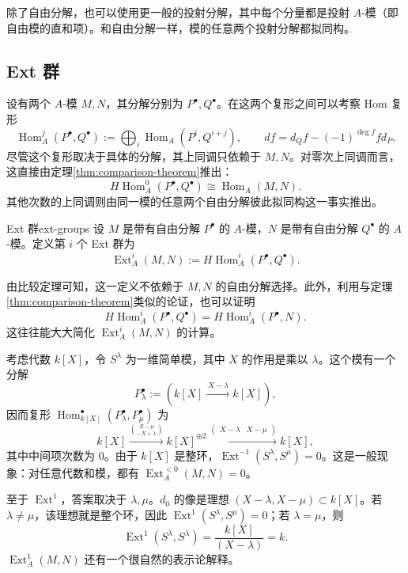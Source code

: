 \begin{note}
除了自由分解，也可以使用更一般的投射分解，其中每个分量都是投射 $A$-模（即自由模的直和项）。和自由分解一样，模的任意两个投射分解都拟同构。
\end{note}

\subsection{Ext 群}\label{subsec:ext-groups}
设有两个 $A$-模 $M,N$，其分解分别为 $P^\bullet,Q^\bullet$。在这两个复形之间可以考察 Hom 复形
\[
  \operatorname{Hom}_A^j(P^\bullet,Q^\bullet)
  :=\bigoplus_i\operatorname{Hom}_A(P^i,Q^{i+j}),
  \qquad
  df=d_Qf-(-1)^{\deg f}fd_P.
\]
尽管这个复形取决于具体的分解，其上同调只依赖于 $M,N$。对零次上同调而言，这直接由定理\ref{thm:comparison-theorem}推出：
\[
  H\operatorname{Hom}_A^0(P^\bullet,Q^\bullet)
  \cong\operatorname{Hom}_A(M,N).
\]
其他次数的上同调则由同一模的任意两个自由分解彼此拟同构这一事实推出。

\begin{definition}{Ext 群}{ext-groups}
设 $M$ 是带有自由分解 $P^\bullet$ 的 $A$-模，$N$ 是带有自由分解 $Q^\bullet$ 的 $A$-模。定义第 $i$ 个 Ext 群为
\[
  \operatorname{Ext}_A^i(M,N):=
  H\operatorname{Hom}_A^i(P^\bullet,Q^\bullet).
\]
\end{definition}

\begin{note}
由比较定理可知，这一定义不依赖于 $M,N$ 的自由分解选择。此外，利用与定理\ref{thm:comparison-theorem}类似的论证，也可以证明
\[
  H\operatorname{Hom}_A^i(P^\bullet,Q^\bullet)
  =H\operatorname{Hom}_A^i(P^\bullet,N).
\]
这往往能大大简化 $\operatorname{Ext}_A^i(M,N)$ 的计算。
\end{note}

\begin{example}\label{ex:ext-polynomial-one-variable}
考虑代数 $k[X]$，令 $S^\lambda$ 为一维简单模，其中 $X$ 的作用是乘以 $\lambda$。这个模有一个分解
\[
  P_\lambda^\bullet:=
  \left(k[X]\xrightarrow{\,X-\lambda\,}k[X]\right),
\]
因而复形 $\operatorname{Hom}_{k[X]}^\bullet(P_\lambda^\bullet,P_\mu^\bullet)$ 为
\[
  k[X]\xrightarrow{\binom{X-\mu}{-X+\lambda}}
  k[X]^{\oplus2}\xrightarrow{\left(\begin{smallmatrix}X-\lambda&X-\mu\end{smallmatrix}\right)}
  k[X],
\]
其中中间项次数为 $0$。由于 $k[X]$ 是整环，$\operatorname{Ext}^{-1}(S^\lambda,S^\mu)=0$。这是一般现象：对任意代数和模，都有 $\operatorname{Ext}_A^{<0}(M,N)=0$。

至于 $\operatorname{Ext}^1$，答案取决于 $\lambda,\mu$。$d_0$ 的像是理想 $(X-\lambda,X-\mu)\subset k[X]$。若 $\lambda\neq\mu$，该理想就是整个环，因此 $\operatorname{Ext}^1(S^\lambda,S^\mu)=0$；若 $\lambda=\mu$，则
\[
  \operatorname{Ext}^1(S^\lambda,S^\lambda)
  =\frac{k[X]}{(X-\lambda)}=k.
\]
$\operatorname{Ext}_A^1(M,N)$ 还有一个很自然的表示论解释。
\end{example}

